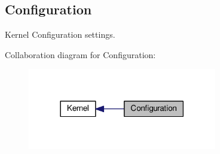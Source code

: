 \hypertarget{group__kern__cfg}{\subsection{Configuration}
\label{group__kern__cfg}
}


Kernel Configuration settings.  


Collaboration diagram for Configuration\-:\nopagebreak
\begin{figure}[H]
\begin{center}
\leavevmode
\includegraphics[width=234pt]{group__kern__cfg}
\end{center}
\end{figure}
